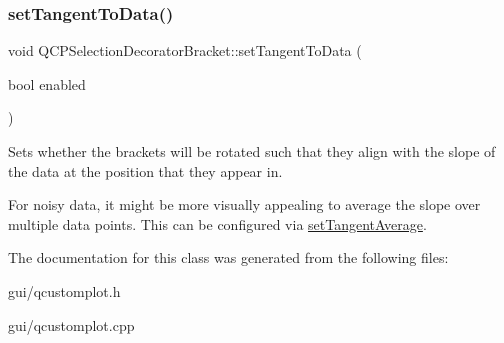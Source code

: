 \subsubsection{\texorpdfstring{set\+Tangent\+To\+Data()}{setTangentToData()}}
{\footnotesize\ttfamily void Q\+C\+P\+Selection\+Decorator\+Bracket\+::set\+Tangent\+To\+Data (\begin{DoxyParamCaption}\item[{bool}]{enabled }\end{DoxyParamCaption})}

Sets whether the brackets will be rotated such that they align with the slope of the data at the position that they appear in.

For noisy data, it might be more visually appealing to average the slope over multiple data points. This can be configured via \hyperlink{classQCPSelectionDecoratorBracket_adb2d0876f25a77c88042b70818f1d6e4}{set\+Tangent\+Average}. 

The documentation for this class was generated from the following files\+:\begin{DoxyCompactItemize}
\item 
gui/qcustomplot.\+h\item 
gui/qcustomplot.\+cpp\end{DoxyCompactItemize}
